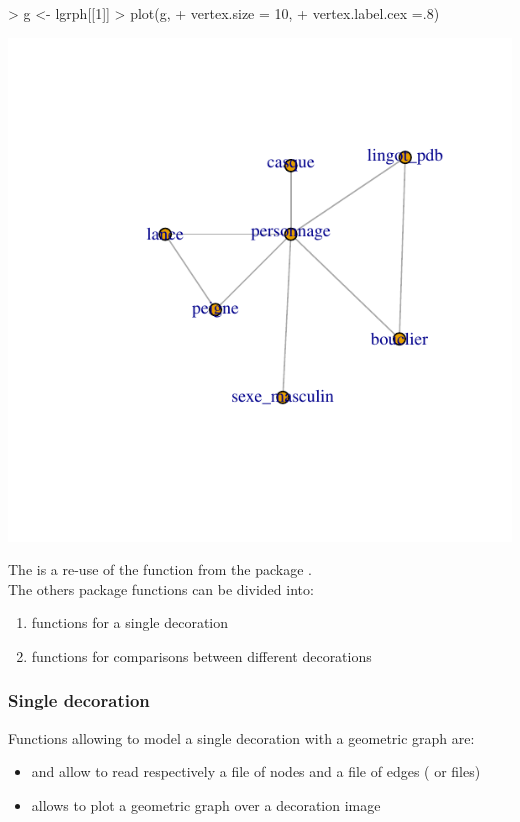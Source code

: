 \documentclass[article]{jss}
\begin{document}
\begin{Schunk}
\begin{Sinput}
> g <- lgrph[[1]]
> plot(g,
+      vertex.size = 10,
+      vertex.label.cex =.8)
\end{Sinput}
\end{Schunk}
\includegraphics{article_rvTH11-g.plot}

The  is a re-use of the  function from the  package \citep{Snow20}.\\
The others  package functions can be divided into:
\begin{enumerate}
 \item functions for a single decoration
 \item functions for comparisons between different decorations
\end{enumerate}

\subsubsection{Single decoration} \label{sec:functions_one}

Functions allowing to model a single decoration with a geometric graph are:

\begin{itemize}
  \item {} and  allow to read respectively a file of nodes and a file of edges ( or  files)
  \item {} allows to plot a geometric graph over a decoration image
\end{itemize}
\end{document}
